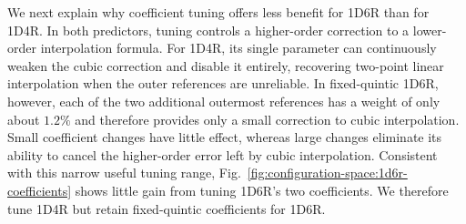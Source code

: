 We next explain why coefficient tuning offers less benefit for 1D6R than for 1D4R. In both predictors, tuning controls a higher-order correction to a lower-order interpolation formula. For 1D4R, its single parameter can continuously weaken the cubic correction and disable it entirely, recovering two-point linear interpolation when the outer references are unreliable. In fixed-quintic 1D6R, however, each of the two additional outermost references has a weight of only about $1.2\%$ and therefore provides only a small correction to cubic interpolation. Small coefficient changes have little effect, whereas large changes eliminate its ability to cancel the higher-order error left by cubic interpolation. Consistent with this narrow useful tuning range, Fig.~\ref{fig:configuration-space:1d6r-coefficients} shows little gain from tuning 1D6R's two coefficients. We therefore tune 1D4R but retain fixed-quintic coefficients for 1D6R.



